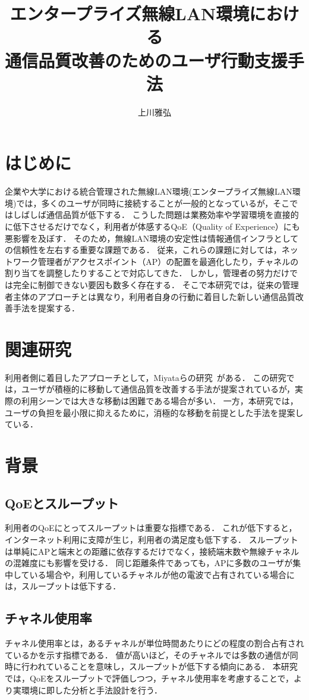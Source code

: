 \documentclass[dvipdfmx,twocolumn]{jsarticle}
\title{エンタープライズ無線LAN環境における\\通信品質改善のためのユーザ行動支援手法}
\author{上川雅弘}
\newcommand{\Note}[1]{\noindent \textbf{\textcolor{blue}{#1}}}
\begin{document}
\maketitle

\section{はじめに}
企業や大学における統合管理された無線LAN環境(エンタープライズ無線LAN環境)では，多くのユーザが同時に接続することが一般的となっているが，そこではしばしば通信品質が低下する．
こうした問題は業務効率や学習環境を直接的に低下させるだけでなく，利用者が体感するQoE（Quality of Experience）にも悪影響を及ぼす．
そのため，無線LAN環境の安定性は情報通信インフラとしての信頼性を左右する重要な課題である．
従来，これらの課題に対しては，ネットワーク管理者がアクセスポイント（AP）の配置を最適化したり，チャネルの割り当てを調整したりすることで対応してきた．
しかし，管理者の努力だけでは完全に制御できない要因も数多く存在する．
そこで本研究では，従来の管理者主体のアプローチとは異なり，利用者自身の行動に着目した新しい通信品質改善手法を提案する．
\section{関連研究}
利用者側に着目したアプローチとして，Miyataらの研究~\cite{Miyata2012}がある．
この研究では，ユーザが積極的に移動して通信品質を改善する手法が提案されているが，実際の利用シーンでは大きな移動は困難である場合が多い．
一方，本研究では，ユーザの負担を最小限に抑えるために，消極的な移動を前提とした手法を提案している．
\section{背景}
\subsection{QoEとスループット}
利用者のQoEにとってスループットは重要な指標である．
これが低下すると，インターネット利用に支障が生じ，利用者の満足度も低下する．
スループットは単純にAPと端末との距離に依存するだけでなく，接続端末数や無線チャネルの混雑度にも影響を受ける．
同じ距離条件であっても，APに多数のユーザが集中している場合や，利用しているチャネルが他の電波で占有されている場合には，スループットは低下する．
\subsection{チャネル使用率}
チャネル使用率とは，あるチャネルが単位時間あたりにどの程度の割合占有されているかを示す指標である．
値が高いほど，そのチャネルでは多数の通信が同時に行われていることを意味し，スループットが低下する傾向にある．
本研究では，QoEをスループットで評価しつつ，チャネル使用率を考慮することで，より実環境に即した分析と手法設計を行う．
\end{document}
